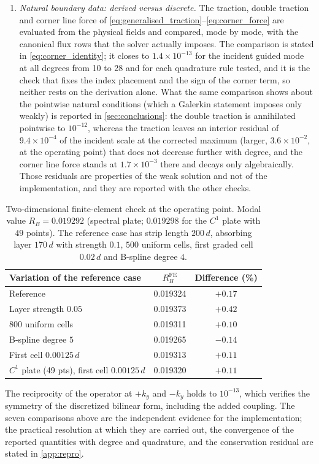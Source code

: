 \begin{enumerate}
Gauss, carrier-continuity, traction, double-traction and blocking residuals are
below $10^{-8}$ in the normalized measure reported in
\cref{fig:fig09}(c), and the scaled edge residual is below $10^{-12}$.
\item \emph{Natural boundary data: derived versus discrete.}  The traction,
double traction and corner line force of
\eqref{eq:generalised_traction}--\eqref{eq:corner_force} are evaluated from the
physical fields and compared, mode by mode, with the canonical flux rows that
the solver actually imposes.  The comparison is stated in
\eqref{eq:corner_identity}; it closes to $1.4\times10^{-13}$ for the incident
guided mode at all degrees from 10 to 28 and for each quadrature rule tested, and it is the check that fixes the index placement and the sign of the corner term, so neither rests on the derivation alone.  What the same comparison shows
about the pointwise natural conditions (which a Galerkin statement imposes
only weakly) is reported in \cref{sec:conclusions}: the double traction
is annihilated pointwise to $10^{-12}$, whereas the traction leaves an interior
residual of $9.4\times10^{-4}$ of the incident scale at the corrected maximum
(larger, $3.6\times10^{-2}$, at the operating point) that does not decrease
further with degree, and the corner line force stands at $1.7\times10^{-3}$ there
and decays only algebraically.  Those residuals are properties of the
weak solution and not of the implementation, and they are reported with the other checks.
\end{enumerate}

\begin{table}[t]
\centering
\caption{Two-dimensional finite-element check at the operating point.  Modal value $R_B=0.019292$ (spectral plate; $0.019298$ for the $C^{1}$ plate with $49$ points).  The reference case has strip length $200\,d$, absorbing layer $170\,d$ with strength $0.1$, $500$ uniform cells, first graded cell $0.02\,d$ and B-spline degree $4$.}
\label{tab:fe2d}
\begin{tabular}{lcc}
\toprule
Variation of the reference case & $R_B^{\mathrm{FE}}$ & Difference (\%) \\
\midrule
Reference & 0.019324 & $+0.17$ \\
Layer strength $0.05$ & 0.019373 & $+0.42$ \\
$800$ uniform cells & 0.019311 & $+0.10$ \\
B-spline degree $5$ & 0.019265 & $-0.14$ \\
First cell $0.00125\,d$ & 0.019313 & $+0.11$ \\
$C^{1}$ plate (49 pts), first cell $0.00125\,d$ & 0.019320 & $+0.11$ \\
\bottomrule
\end{tabular}
\end{table}

The reciprocity of the operator at $+k_y$ and $-k_y$ holds to $10^{-13}$, which verifies the symmetry of the discretized bilinear form, including the added coupling.  The seven comparisons above are the independent evidence for the
implementation; the practical resolution at which they are carried out, the
convergence of the reported quantities with degree and quadrature, and the
conservation residual are stated in \cref{app:repro}.
